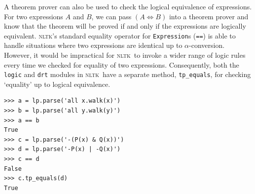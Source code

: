 \documentclass[11pt, a4paper]{article}
\newcommand{\NLTK}{\textsc{nltk}}
\begin{document}
A theorem prover can also be used to check the logical equivalence of
expressions.  For two expressions $A$ and $B$, we can pass $(A\iff B)$
into a theorem prover and know that the theorem will be proved if and
only if the expressions are logically equivalent.  \NLTK's standard
equality operator for \texttt{Expression}s (\texttt{==}) is able to
handle situations where two expressions are identical up to
$\alpha$-conversion.  However, it would be impractical for \NLTK\ to
invoke a wider range of logic rules every time we checked for equality
of two expressions. Consequently, both the \texttt{logic} and 
\texttt{drt} modules in \NLTK\ 
have a separate method, \texttt{tp\_equals}, for checking `equality'
up to logical equivalence.

\begin{Verbatim}
>>> a = lp.parse('all x.walk(x)')
>>> b = lp.parse('all y.walk(y)')
>>> a == b
True
>>> c = lp.parse('-(P(x) & Q(x))')
>>> d = lp.parse('-P(x) | -Q(x)')
>>> c == d
False
>>> c.tp_equals(d)
True
\end{Verbatim}



\end{document}
